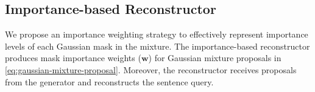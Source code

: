 \subsection{Importance-based Reconstructor}
\label{sec:importance-based-reconstructor}

We propose an importance weighting strategy to effectively represent importance levels of each Gaussian mask in the mixture.
The importance-based reconstructor produces mask importance weights ($\mathbf{w}$) for Gaussian mixture proposals in \cref{eq:gaussian-mixture-proposal}.
Moreover, the reconstructor receives proposals from the generator and reconstructs the sentence query. 


